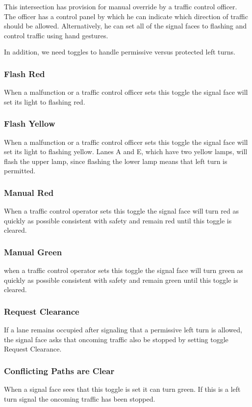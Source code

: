 \documentclass[letterpaper,twoside]{article}
\begin{document}
This intersection has provision for manual override by a traffic control
officer.  The officer has a control panel by which he can indicate which
direction of traffic should be allowed.  Alternatively, he can set all
of the signal faces to flashing and control traffic using hand gestures.

In addition, we need toggles to handle permissive versus protected
left turns.

\subsubsection{Flash Red}
When a malfunction or a traffic control officer sets this toggle
the signal face will set its light to flashing red.

\subsubsection{Flash Yellow}
When a malfunction or a traffic control officer sets this toggle
the signal face will set its light to flashing yellow.
Lanes A and E, which have two yellow lamps, will flash the upper lamp,
since flashing the lower lamp means that left turn is permitted.

\subsubsection{Manual Red}
When a traffic control operator sets this toggle the signal face will
turn red as quickly as possible consistent with safety and remain
red until this toggle is cleared.

\subsubsection{Manual Green}
when a traffic control operator sets this toggle the signal face will
turn green as quickly as possible consistent with safety and remain
green until this toggle is cleared.

\subsubsection{Request Clearance}
If a lane remains occupied after signaling that a permissive left
turn is allowed, the signal face asks that oncoming traffic also
be stopped by setting toggle Request Clearance.

\subsubsection{Conflicting Paths are Clear}
When a signal face sees that this toggle is set it can turn green.
If this is a left turn signal the oncoming traffic has been stopped.
\end{document}

